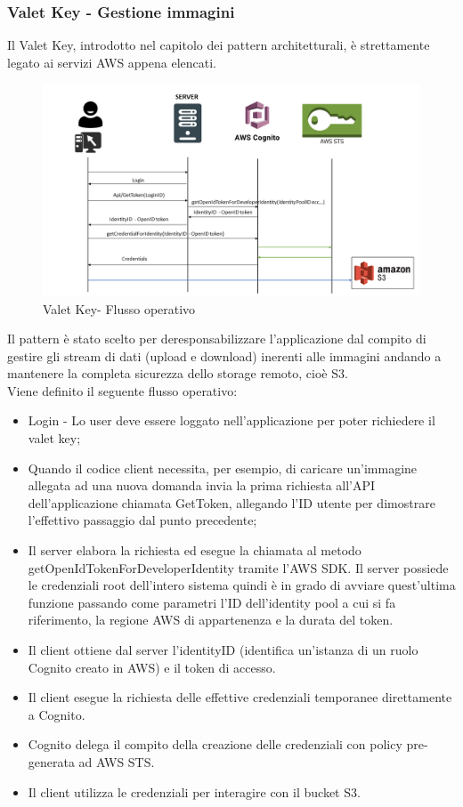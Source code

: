 \documentclass[12pt]{article}
\begin{document}
\subsubsection{Valet Key - Gestione immagini}
Il Valet Key, introdotto nel capitolo dei pattern architetturali, è strettamente legato ai servizi AWS appena elencati.
\begin{figure}[H]
\includegraphics[scale=0.5, left]{diapAWS.png}
\caption{Valet Key- Flusso operativo}
\end{figure}
Il pattern è stato scelto per deresponsabilizzare l'applicazione dal compito di gestire gli stream di dati (upload e download) inerenti alle immagini andando a mantenere la completa sicurezza dello storage remoto, cioè S3.\\
Viene definito il seguente flusso operativo:
\begin{itemize}
\item Login - Lo user deve essere loggato nell'applicazione per poter richiedere il valet key;
\item Quando il codice client necessita, per esempio, di caricare un'immagine allegata ad una nuova domanda invia la prima richiesta all'API dell'applicazione chiamata GetToken, allegando l'ID utente per dimostrare l'effettivo passaggio dal punto precedente;
\item Il server elabora la richiesta ed esegue la chiamata al metodo getOpenIdTokenForDeveloperIdentity tramite l'AWS SDK. Il server possiede le credenziali root dell'intero sistema quindi è in grado di avviare quest'ultima funzione passando come parametri l'ID dell'identity pool a cui si fa riferimento, la regione AWS di appartenenza e la durata del token.
\item Il client ottiene dal server l'identityID (identifica un'istanza di un ruolo Cognito creato in AWS) e il token di accesso.
\item Il client esegue la richiesta delle effettive credenziali temporanee direttamente a Cognito.
\item Cognito delega il compito della creazione delle credenziali con policy pre-generata ad AWS STS.
\item Il client utilizza le credenziali per interagire con il bucket S3.
\end{itemize}
\end{document}
